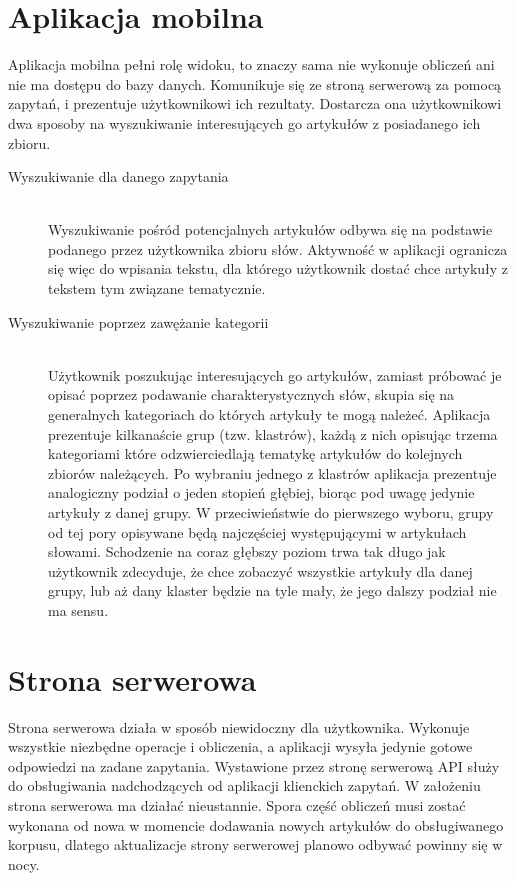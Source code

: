 \section{Aplikacja mobilna}
Aplikacja mobilna pełni rolę widoku, to znaczy sama nie wykonuje obliczeń ani nie ma dostępu do bazy danych. Komunikuje się ze stroną serwerową za pomocą zapytań, i prezentuje użytkownikowi ich rezultaty. Dostarcza ona użytkownikowi dwa sposoby na wyszukiwanie interesujących go artykułów z posiadanego ich zbioru.

\begin{description}
  \item[Wyszukiwanie dla danego zapytania] \hfill \\
  Wyszukiwanie pośród potencjalnych artykułów odbywa się na podstawie podanego przez użytkownika zbioru słów. Aktywność w aplikacji ogranicza się więc do wpisania tekstu, dla którego użytkownik dostać chce artykuły z tekstem tym związane tematycznie.
  \item[Wyszukiwanie poprzez zawężanie kategorii] \hfill \\
  Użytkownik poszukując interesujących go artykułów,  zamiast próbować je opisać poprzez podawanie charakterystycznych słów,  skupia się na generalnych kategoriach do których artykuły te mogą należeć. Aplikacja prezentuje kilkanaście grup (tzw. klastrów), każdą z nich opisując trzema kategoriami które odzwierciedlają tematykę artykułów do kolejnych zbiorów należących. Po wybraniu jednego z klastrów aplikacja prezentuje analogiczny podział o jeden stopień głębiej, biorąc pod uwagę jedynie artykuły z danej grupy. W przeciwieństwie do pierwszego wyboru, grupy od tej pory opisywane będą najczęściej występującymi w artykułach słowami. Schodzenie na coraz głębszy poziom trwa tak długo jak użytkownik zdecyduje, że chce zobaczyć wszystkie artykuły dla danej grupy, lub aż dany klaster będzie na tyle mały, że jego dalszy podział nie ma sensu.

\end{description}

\section{Strona serwerowa}
Strona serwerowa działa w sposób niewidoczny dla użytkownika. Wykonuje wszystkie niezbędne operacje i obliczenia, a aplikacji wysyła jedynie gotowe odpowiedzi na zadane zapytania. Wystawione przez stronę serwerową API służy do obsługiwania nadchodzących od aplikacji klienckich zapytań. W założeniu strona serwerowa ma działać nieustannie. Spora część obliczeń musi zostać wykonana od nowa w momencie dodawania nowych artykułów do obsługiwanego korpusu, dlatego aktualizacje strony serwerowej planowo odbywać powinny się w nocy.

